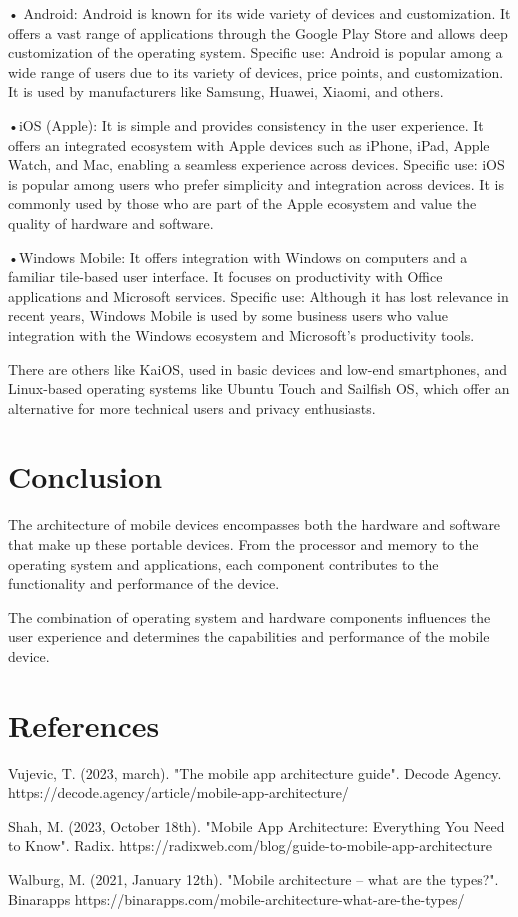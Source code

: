 \documentclass{article}
\begin{document}
\begin{multicols}{2}
		• Android: Android is known for its wide variety of devices and customization. It offers a vast range of applications through the Google Play Store and allows deep customization of the operating system.
		Specific use: Android is popular among a wide range of users due to its variety of devices, price points, and customization. It is used by manufacturers like Samsung, Huawei, Xiaomi, and others.
		
		
		•iOS (Apple):
		It is simple and provides consistency in the user experience. It offers an integrated ecosystem with Apple devices such as iPhone, iPad, Apple Watch, and Mac, enabling a seamless experience across devices.
		Specific use: iOS is popular among users who prefer simplicity and integration across devices. It is commonly used by those who are part of the Apple ecosystem and value the quality of hardware and software.
		
		
		•Windows Mobile:
		It offers integration with Windows on computers and a familiar tile-based user interface. It focuses on productivity with Office applications and Microsoft services.
		Specific use: Although it has lost relevance in recent years, Windows Mobile is used by some business users who value integration with the Windows ecosystem and Microsoft's productivity tools.
		
		There are others like KaiOS, used in basic devices and low-end smartphones, and Linux-based operating systems like Ubuntu Touch and Sailfish OS, which offer an alternative for more technical users and privacy enthusiasts.
		
		\section{Conclusion}
		The architecture of mobile devices encompasses both the hardware and software that make up these portable devices. From the processor and memory to the operating system and applications, each component contributes to the functionality and performance of the device.
		
		The combination of operating system and hardware components influences the user experience and determines the capabilities and performance of the mobile device.
		
		
	\end{multicols} 
	\section{References}
	Vujevic, T. (2023, march). "The mobile app architecture guide". Decode Agency. https://decode.agency/article/mobile-app-architecture/
	
	
	
	Shah, M. (2023, October 18th). "Mobile App Architecture: Everything You Need to Know". Radix.
	https://radixweb.com/blog/guide-to-mobile-app-architecture
	
	
	
	Walburg, M. (2021, January 12th). "Mobile architecture – what are the types?". Binarapps
	https://binarapps.com/mobile-architecture-what-are-the-types/
	
\end{document}

